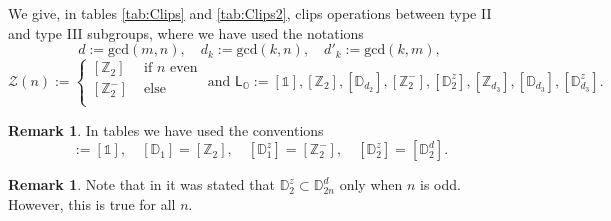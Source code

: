 \documentclass[11pt,a4paper]{amsart}
\theoremstyle{definition}
\newtheorem{rem}[thm]{Remark}
\newcommand{\ZZ}{\mathbb{Z}}                %
\newcommand{\octa}{\mathbb{O}}              %
\newcommand{\DD}{\mathbb{D}}                %
\newcommand{\1}{\mathds{1}}		            %
\begin{document}
We give, in tables \ref{tab:Clips} and \ref{tab:Clips2}, clips operations between type II and type III subgroups, where we have used the notations
  \begin{equation*}
    d:=\mathrm{gcd}(m,n),\quad d_k:=\mathrm{gcd}(k,n),\quad d'_k:=\mathrm{gcd}(k,m),
  \end{equation*}
  \begin{equation*}\label{eq:Def_Gamma_n}
    \mathcal{Z}(n):=\begin{cases}
      [\ZZ_{2}]   & \text{ if } n \text{ even} \\
      [\ZZ_{2}^-] & \text{ else}               \\
    \end{cases} \text{ and  }   \mathsf{L}_{\octa}:=[\1],[\ZZ_2],[\DD_{d_2}],[\ZZ_2^-],[\DD_2^z],[\ZZ_{d_3}],[\DD_{d_3}],[\DD_{d_3}^z].
  \end{equation*}
 

\begin{rem}
  In tables we have used the conventions
  \begin{equation*}
    [\ZZ_1]:=[\1],\quad [\DD_1]=[\ZZ_2],\quad [\DD_1^z]=[\ZZ_2^-], \quad [\DD_2^z]=[\DD_2^d].
  \end{equation*}
\end{rem}

\begin{rem}
  Note that in \cite[figure 3]{Olive2019} it was stated that $\DD_2^z\subset\DD_{2n}^d$ only when $n$ is odd. However, this is true for all $n$.
\end{rem}
\end{document}
